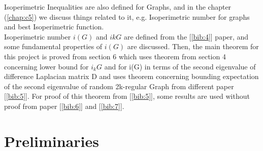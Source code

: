 \documentclass[oneside]{book}
\begin{document}
	Isoperimetric Inequalities are also defined for Graphs, and in the chapter (\ref{chap:c5}) we discuss things related to it, e.g. Isoperimetric number for graphs and  best Isoperimetric function.\\
	Isoperimetric number $i(G)$ and $i k{G}$ are defined from the [\ref{bib:4}] paper, and some fundamental properties of $i(G)$ are discussed. Then,  the main theorem for this project is proved from section 6 which uses theorem from section 4 concerning lower bound for $i_k{G}$ and for i(G) in terms of the second eigenvalue of difference Laplacian matrix D and uses theorem concerning bounding expectation of the second eigenvalue of random 2k-regular Graph from different paper [\ref{bib:5}]. For proof of this theorem from [\ref{bib:5}], some results are used without proof from paper [\ref{bib:6}] and [\ref{bib:7}].
	
	
	
	
	
	
	
	
	
	
	
	
	
	
	
	
	
	
	
	
	
	
	
	
	
	
	
	
	
	
	
	
	
	
	
	
	
	
	
	
	
	
	
	
	
	
	
	
	
	\chapter{Preliminaries }
	\label{chap:c2}
	
	
	
	
	
	
	
	
	
	
	
	
	
\end{document}
